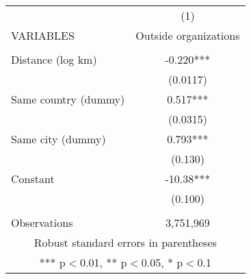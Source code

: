 \begin{tabular}{lc} \hline
 & (1) \\
VARIABLES & Outside organizations \\ \hline
 &  \\
Distance (log km) & -0.220*** \\
 & (0.0117) \\
Same country (dummy) & 0.517*** \\
 & (0.0315) \\
Same city (dummy) & 0.793*** \\
 & (0.130) \\
Constant & -10.38*** \\
 & (0.100) \\
 &  \\
 Observations & 3,751,969 \\ \hline
\multicolumn{2}{c}{ Robust standard errors in parentheses} \\
\multicolumn{2}{c}{ *** p$<$0.01, ** p$<$0.05, * p$<$0.1} \\
\end{tabular}
